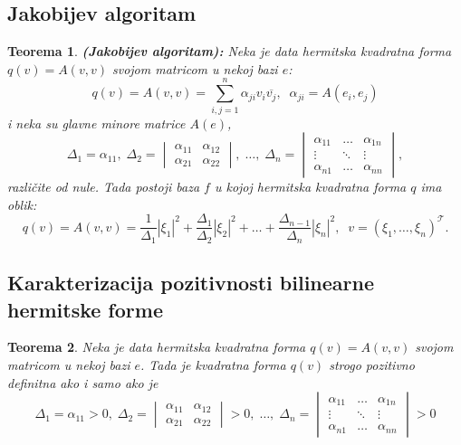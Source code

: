 \documentclass[a4paper,12pt,twoside]{report}
\newtheorem{theorem}{Teorema}[section]
\numberwithin{algorithm}{section}
\begin{document}
\subsection{Jakobijev algoritam}

\begin{theorem}
    \textbf{(Jakobijev algoritam):} Neka je data hermitska kvadratna forma $q(v) = A(v, v)$ svojom matricom u nekoj bazi $e$:
    \[ q(v) = A(v, v) = \sum_{i, j = 1}^{n} \alpha_{ji}v_i\overline{v_j}, \;\; \alpha_{ji} = A(e_i, e_j) \]
    i neka su glavne minore matrice $A(e)$,
    \[ \Delta_1 = \alpha_{11}, \; \Delta_2 = \begin{vmatrix}
        \alpha_{11} & \alpha_{12}\\
        \alpha_{21} & \alpha_{22}
    \end{vmatrix}, \; \dots, \; \Delta_n = \begin{vmatrix}
        \alpha_{11} & \dots & \alpha_{1n} \\
        \vdots & \ddots & \vdots\\
        \alpha_{n1} & \dots & \alpha_{nn}
    \end{vmatrix}, \] različite od nule. Tada postoji baza $f$ u kojoj hermitska kvadratna forma $q$ ima oblik:
    \[ q(v) = A(v, v) = \frac{1}{\Delta_1}|\xi_1|^2 + \frac{\Delta_1}{\Delta_2}|\xi_2|^2 + \dots + \frac{\Delta_{n-1}}{\Delta_n}|\xi_n|^2, \;\; v = (\xi_1, \dots, \xi_n)^\mathcal{T}. \]
\end{theorem}

\subsection{Karakterizacija pozitivnosti bilinearne hermitske forme}

\begin{theorem}
    Neka je data hermitska kvadratna forma $q(v) = A(v, v)$ svojom matricom u nekoj bazi $e$. Tada je kvadratna forma $q(v)$ strogo pozitivno definitna ako i samo ako je
    \[ \Delta_1 = \alpha_{11} > 0, \; \Delta_2 = \begin{vmatrix}
        \alpha_{11} & \alpha_{12}\\
        \alpha_{21} & \alpha_{22}
    \end{vmatrix} > 0, \; \dots, \; \Delta_n = \begin{vmatrix}
        \alpha_{11} & \dots & \alpha_{1n} \\
        \vdots & \ddots & \vdots\\
        \alpha_{n1} & \dots & \alpha_{nn}
    \end{vmatrix} > 0 \]
\end{theorem}
\end{document}
